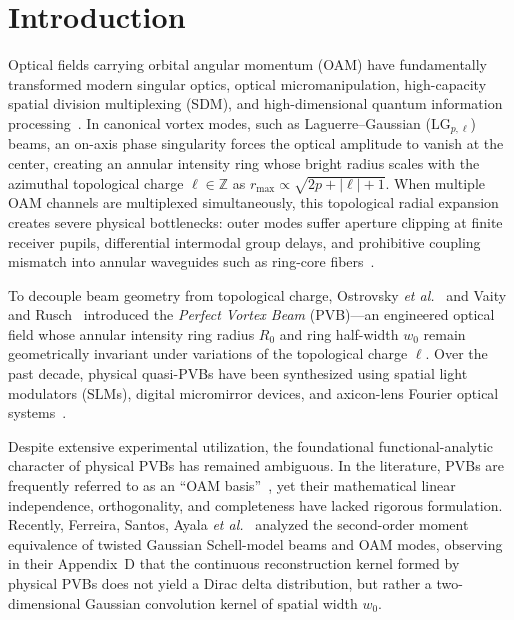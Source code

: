 \documentclass{optica-article}
\begin{document}
\section{Introduction}
\label{sec:intro}

Optical fields carrying orbital angular momentum (OAM) have fundamentally transformed modern singular optics, optical micromanipulation, high-capacity spatial division multiplexing (SDM), and high-dimensional quantum information processing~\cite{Allen1992,Durnin1987,Mair2001,Dennis2009,FrankeArnold2008,Berry1998,Berry2004,Barnett2002,Padgett1999,Gbur2016,MandelWolf1995,Siegman1986}. In canonical vortex modes, such as Laguerre--Gaussian ($\text{LG}_{p, \ell}$) beams, an on-axis phase singularity forces the optical amplitude to vanish at the center, creating an annular intensity ring whose bright radius scales with the azimuthal topological charge $\ell \in \mathbb{Z}$ as $r_{\max} \propto \sqrt{2p + |\ell| + 1}$. When multiple OAM channels are multiplexed simultaneously, this topological radial expansion creates severe physical bottlenecks: outer modes suffer aperture clipping at finite receiver pupils, differential intermodal group delays, and prohibitive coupling mismatch into annular waveguides such as ring-core fibers~\cite{Villalba2023,RojasRojas2021,Canas2021,Ramachandran2009,Bozinovic2013,Willner2015,Brunet2014,Gregg2015,Zhu2018,Wang2012}.

To decouple beam geometry from topological charge, Ostrovsky \emph{et al.}~\cite{Ostrovsky2013} and Vaity and Rusch~\cite{Vaity2015} introduced the \emph{Perfect Vortex Beam} (PVB)---an engineered optical field whose annular intensity ring radius $R_0$ and ring half-width $w_0$ remain geometrically invariant under variations of the topological charge $\ell$. Over the past decade, physical quasi-PVBs have been synthesized using spatial light modulators (SLMs), digital micromirror devices, and axicon-lens Fourier optical systems~\cite{Chen2013,Reddy2016,Jabir2016,GarciaGarcia2014,Li2018PVB,PerezGarcia2017,Arrizon2007}.

Despite extensive experimental utilization, the foundational functional-analytic character of physical PVBs has remained ambiguous. In the literature, PVBs are frequently referred to as an ``OAM basis''~\cite{GarciaEscartin2008}, yet their mathematical linear independence, orthogonality, and completeness have lacked rigorous formulation. Recently, Ferreira, Santos, Ayala \emph{et al.}~\cite{Ferreira2026} analyzed the second-order moment equivalence of twisted Gaussian Schell-model beams and OAM modes, observing in their Appendix~D that the continuous reconstruction kernel formed by physical PVBs does not yield a Dirac delta distribution, but rather a two-dimensional Gaussian convolution kernel of spatial width $w_0$.
\end{document}
